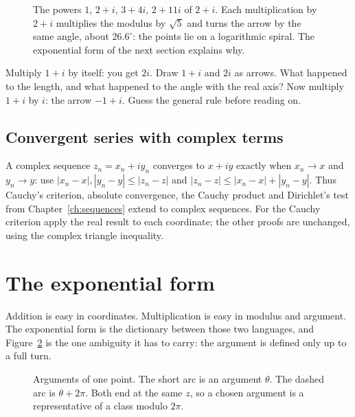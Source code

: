 \begin{figure}[ht]
\centering
{}
\caption{The powers $1$, $2+i$, $3+4i$, $2+11i$ of $2+i$. Each multiplication by $2+i$ multiplies the modulus by $\sqrt5$ and turns the arrow by the same angle, about $26.6^\circ$: the points lie on a logarithmic spiral. The exponential form of the next section explains why.}
\label{fig:bombelli}
\end{figure}

\begin{think}
Multiply $1+i$ by itself: you get $2i$. Draw $1+i$ and $2i$ as arrows. What happened to the length, and what happened to the angle with the real axis? Now multiply $1+i$ by $i$: the arrow $-1+i$. Guess the general rule before reading on.
\end{think}

\subsection*{Convergent series with complex terms}
A complex sequence $z_n=x_n+iy_n$ converges to $x+iy$ exactly when
$x_n\to x$ and $y_n\to y$: use $|x_n-x|,|y_n-y|\le|z_n-z|$ and
$|z_n-z|\le|x_n-x|+|y_n-y|$. Thus Cauchy's criterion, absolute
convergence, the Cauchy product and Dirichlet's test from
Chapter~\ref{ch:sequences} extend to complex sequences. For the Cauchy
criterion apply the real result to each coordinate; the other proofs are
unchanged, using the complex triangle inequality.

\section{The exponential form}

Addition is easy in coordinates. Multiplication is easy in modulus and argument. The exponential form is the dictionary between those two languages, and Figure~\ref{fig:arguments} is the one ambiguity it has to carry: the argument is defined only up to a full turn.

\begin{figure}[ht]
\centering
{}
\caption{Arguments of one point. The short arc is an argument $\theta$. The dashed arc is $\theta+2\pi$. Both end at the same $z$, so a chosen argument is a representative of a class modulo $2\pi$.}
\label{fig:arguments}
\end{figure}

